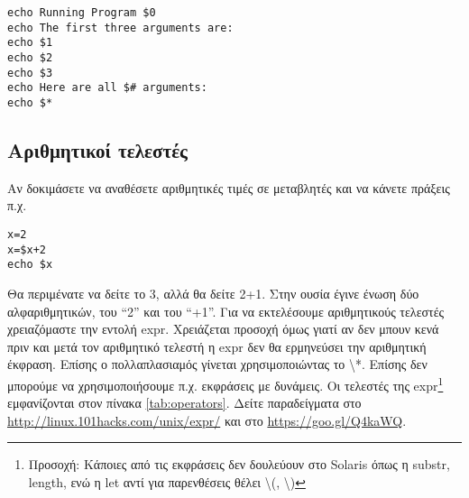 \begin{lstlisting}
echo Running Program $0
echo The first three arguments are: 
echo $1 
echo $2 
echo $3 
echo Here are all $# arguments: 
echo $* 
\end{lstlisting}


\subsection*{Αριθμητικοί τελεστές}
Αν  δοκιμάσετε να αναθέσετε αριθμητικές τιμές σε μεταβλητές και να κάνετε πράξεις π.χ.
\begin{lstlisting}
x=2 
x=$x+2 
echo $x 
\end{lstlisting}

Θα περιμένατε να δείτε το 3, αλλά θα δείτε 2+1. Στην ουσία έγινε ένωση δύο αλφαριθμητικών, του ``2'' και του ``+1''. Για να εκτελέσουμε
αριθμητικούς τελεστές χρειαζόμαστε την εντολή expr. Χρειάζεται προσοχή όμως γιατί αν δεν μπουν κενά πριν και μετά τον αριθμητικό τελεστή η
expr δεν θα ερμηνεύσει την αριθμητική έκφραση. Επίσης ο πολλαπλασιαμός γίνεται χρησιμοποιώντας το {\textbackslash}*. Επίσης δεν μπορούμε να
χρησιμοποιήσουμε π.χ. εκφράσεις με δυνάμεις. Οι τελεστές της expr\footnote{Προσοχή: Κάποιες από τις εκφράσεις δεν δουλεύουν στο Solaris όπως η substr, length, ενώ η let αντί για παρενθέσεις θέλει \textbackslash(, \textbackslash)} εμφανίζονται στον πίνακα \ref{tab:operators}. Δείτε παραδείγματα στο \href{http://linux.101hacks.com/unix/expr/}{http://linux.101hacks.com/unix/expr/} και στο \href{https://goo.gl/Q4kaWQ}{https://goo.gl/Q4kaWQ}.

